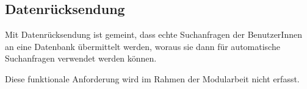 \subsection{Datenrücksendung}
\label{subsec:funktionale-daten}

Mit Datenrücksendung ist gemeint, dass echte Suchanfragen der BenutzerInnen an
eine Datenbank übermittelt werden, woraus sie dann für automatische Suchanfragen
verwendet werden können.

Diese funktionale Anforderung wird im Rahmen der Modularbeit nicht erfasst.
